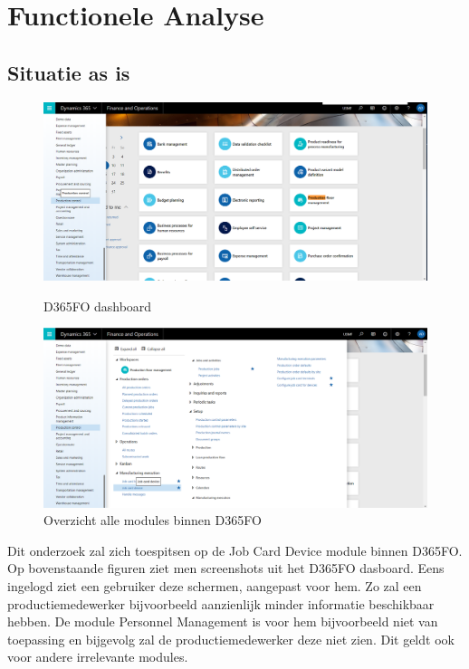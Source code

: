 
\chapter{Functionele Analyse}
\label{ch:funcioneleanalyse}


\section{Situatie as is}
\begin{figure}[h]
\centering
\begin{minipage}[t]{0.49\textwidth}   
    \includegraphics*[width=1\textwidth]{img/d365productionControl1}
    \caption{D365FO dashboard}
\end{minipage}
\begin{minipage}[t]{0.49\textwidth}
    \includegraphics*[width=1\textwidth]{img/d365productionControl2}
    \caption{Overzicht alle modules binnen D365FO}
\end{minipage}
\end{figure}
    
Dit onderzoek zal zich toespitsen op de Job Card Device module binnen D365FO. Op bovenstaande figuren ziet men screenshots uit het D365FO dasboard. Eens ingelogd ziet een gebruiker deze schermen, aangepast voor hem. Zo zal een productiemedewerker bijvoorbeeld aanzienlijk minder informatie beschikbaar hebben. De module Personnel Management is voor hem bijvoorbeeld niet van toepassing en bijgevolg zal de productiemedewerker deze niet zien. Dit geldt ook voor andere irrelevante modules. 

